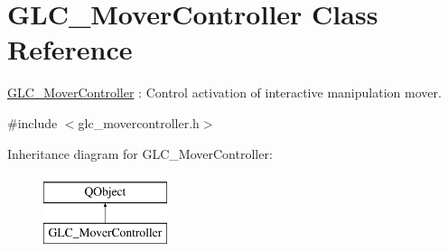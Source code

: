 \hypertarget{class_g_l_c___mover_controller}{\section{G\-L\-C\-\_\-\-Mover\-Controller Class Reference}
\label{class_g_l_c___mover_controller}
}


\hyperlink{class_g_l_c___mover_controller}{G\-L\-C\-\_\-\-Mover\-Controller} \-: Control activation of interactive manipulation mover.  




{\ttfamily \#include $<$glc\-\_\-movercontroller.\-h$>$}

Inheritance diagram for G\-L\-C\-\_\-\-Mover\-Controller\-:\begin{figure}[H]
\begin{center}
\leavevmode
\includegraphics[height=2.000000cm]{class_g_l_c___mover_controller}
\end{center}
\end{figure}
